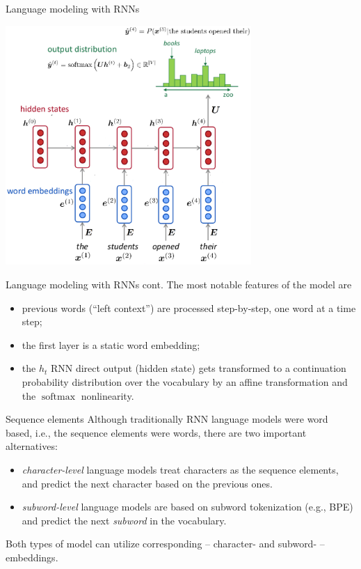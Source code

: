 \documentclass[style=upen, size=14pt]{powerdot}
\DeclareMathOperator*{\softmax}{softmax}
\newcommand{\gold}{\color{arany}}
\theoremstyle{definition}
\begin{document}
\begin{slide}{Language modeling with RNNs}
  \begin{center}
    \includegraphics[width=0.7\textwidth]{figures/rnn_lm.eps}
  \end{center}
\end{slide}

\begin{slide}[toc=]{Language modeling with RNNs cont.}
  The most notable features of the model are
  \begin{itemize}
  \item previous words (``left context'') are processed step-by-step, one word
    at a time step;
  \item the first layer is a static word embedding;
  \item the $h_t$ RNN direct output (hidden state) gets transformed to a
    continuation probability distribution over the vocabulary by an affine
    transformation and the $\softmax$ nonlinearity.
  \end{itemize}
\end{slide}

\begin{slide}[toc=Sequence elements]{Sequence elements}
  Although traditionally RNN language models were word based, i.e., the sequence
  elements were words, there are two important alternatives:
  \begin{itemize}
  \item \emph{\gold character-level} language models treat characters as the
    sequence elements, and predict the next character based on the previous ones.
  \item \emph{\gold subword-level} language models are based on subword
    tokenization (e.g., BPE) and predict the next \emph{subword} in the
    vocabulary.
  \end{itemize}
  Both types of model can utilize corresponding -- character- and subword- --
  embeddings.
\end{slide}
\end{document}
